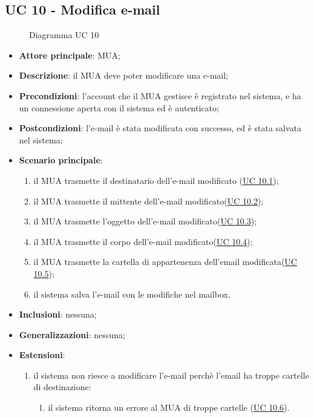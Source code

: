 \subsection{UC 10 - Modifica e-mail} \label{sec:UC10}
    \begin{figure}[h]
        \centering
        \caption{Diagramma UC 10}
    \end{figure}
    \begin{itemize}
        \item \textbf{Attore principale}: MUA;
        \item \textbf{Descrizione}: il MUA deve poter modificare una e-mail;
        \item \textbf{Precondizioni}: l’account che il MUA gestisce è registrato nel sistema, e ha un connessione aperta con il sistema ed è autenticato;
        \item \textbf{Postcondizioni}: l'e-mail è stata modificata con successo, ed è stata salvata nel sistema;
        \item \textbf{Scenario principale}:
            \begin{enumerate}
                \item il MUA trasmette il destinatario dell'e-mail modificato (\hyperref[sec:UC10.1]{UC 10.1});
                \item il MUA trasmette il mittente dell'e-mail modificato(\hyperref[sec:UC10.2]{UC 10.2});
                \item il MUA trasmette l'oggetto dell'e-mail modificato(\hyperref[sec:UC10.3]{UC 10.3});
                \item il MUA trasmette il corpo dell'e-mail modificato(\hyperref[sec:UC10.4]{UC 10.4});
                \item il MUA trasmette la cartella di appartenenza dell'email modificata(\hyperref[sec:UC10.5]{UC 10.5});
                \item il sistema salva l'e-mail con le modifiche nel mailbox.
            \end{enumerate}
        \item \textbf{Inclusioni}: nessuna;
        \item \textbf{Generalizzazioni}: nessuna;
        \item \textbf{Estensioni}: 
            \begin{enumerate}[label=\alph*.]
                \item il sistema non riesce a modificare l'e-mail perchè l'email ha troppe cartelle di destinazione:
                \begin{enumerate}[label=\arabic*.]
                    \item il sistema ritorna un errore al MUA di troppe cartelle (\hyperref[sec:UC10.6]{UC 10.6}).
                \end{enumerate}
            \end{enumerate}
    \end{itemize}

